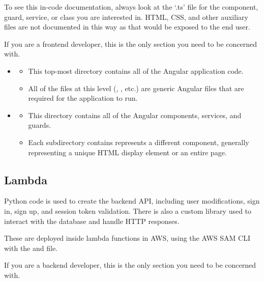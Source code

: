 \documentclass[12pt]{article}
\begin{document}
To see this in-code documentation, always look at the `.ts' file for the component, guard, service, or class you are interested in. HTML, CSS, and other auxiliary files are not documented in this way as that would be exposed to the end user.

If you are a frontend developer, this is the only section you need to be concerned with.

\begin{itemize}
    \item \href{https://github.com/AboutMyHT/angular-app/tree/main/src}{}
          \begin{itemize}
              \item This top-most directory contains all of the Angular application code.
              \item All of the files at this level (, , etc.) are generic Angular files that are required for the application to run.
          \end{itemize}
    \item \href{https://github.com/AboutMyHT/angular-app/tree/main/src/app}{}
          \begin{itemize}
              \item This directory contains all of the Angular components, services, and guards.
              \item Each subdirectory contains represents a different component, generally representing a unique HTML display element or an entire page.
          \end{itemize}
\end{itemize}

\subsection{Lambda}

Python code is used to create the backend API, including user modifications, sign in, sign up, and session token validation. There is also a custom library used to interact with the database and handle HTTP responses.

These are deployed inside lambda functions in AWS, using the AWS SAM CLI with the  and  file.

If you are a backend developer, this is the only section you need to be concerned with.
\end{document}
